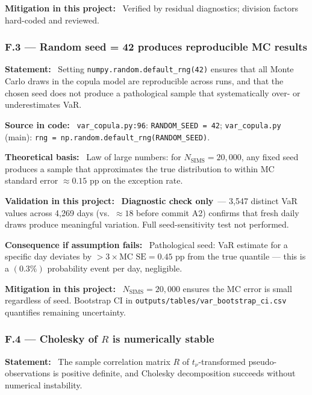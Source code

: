 \documentclass[11pt,a4paper]{article}
\newcommand{\asmfield}[1]{\medskip\noindent\textbf{#1:}\ }
\newcommand{\code}[1]{\texttt{#1}}
\newcommand{\diagnostic}{\textbf{Diagnostic check only}}
\begin{document}
\asmfield{Mitigation in this project}
Verified by residual diagnostics; division factors hard-coded and reviewed.

\subsubsection{F.3 --- Random seed = 42 produces reproducible MC results}\label{asm:F3}

\asmfield{Statement}
Setting \code{numpy.random.default\_rng(42)} ensures that all Monte Carlo
draws in the copula model are reproducible across runs, and that the chosen
seed does not produce a pathological sample that systematically over- or
underestimates VaR.

\asmfield{Source in code}
\code{var\_copula.py:96}: \lstinline|RANDOM_SEED = 42|;
\code{var\_copula.py} (main): \lstinline|rng = np.random.default_rng(RANDOM_SEED)|.

\asmfield{Theoretical basis}
Law of large numbers: for $N_{\mathrm{SIMS}} = 20{,}000$, any fixed seed
produces a sample that approximates the true distribution to within MC
standard error $\approx 0.15$ pp on the exception rate.

\asmfield{Validation in this project}
\diagnostic\ --- 3{,}547 distinct VaR values across 4{,}269 days (vs.\
$\approx 18$ before commit A2) confirms that fresh daily draws produce
meaningful variation. Full seed-sensitivity test not performed.

\asmfield{Consequence if assumption fails}
Pathological seed: VaR estimate for a specific day deviates by
$> 3 \times \text{MC SE} = 0.45$ pp from the true quantile --- this is a
$(0.3\%)$ probability event per day, negligible.

\asmfield{Mitigation in this project}
$N_{\mathrm{SIMS}} = 20{,}000$ ensures the MC error is small regardless
of seed. Bootstrap CI in \code{outputs/tables/var\_bootstrap\_ci.csv}
quantifies remaining uncertainty.

\subsubsection{F.4 --- Cholesky of $R$ is numerically stable}\label{asm:F4}

\asmfield{Statement}
The sample correlation matrix $R$ of $t_\nu$-transformed pseudo-observations
is positive definite, and Cholesky decomposition succeeds without numerical
instability.
\end{document}
